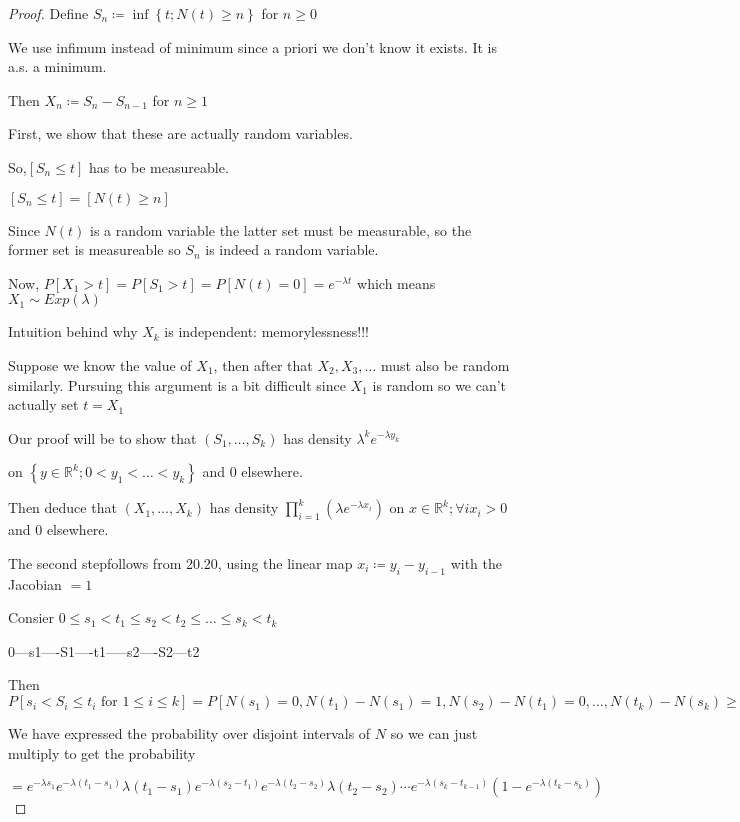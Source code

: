 \documentclass{article}
\theoremstyle{definition}
\begin{document}
\begin{proof}
    Define \(S_n\coloneqq \inf \left\{ t; N(t)\geq n \right\} \) for \(n\geq 0\) 

    We use infimum instead of minimum since a priori we don't know it exists. It is a.s. a minimum.

    Then \(X_n \coloneqq S_n - S_{n-1} \) for \(n\geq 1\) 

    First, we show that these are actually random variables.

    So,\([S_n \leq t]\) has to be measureable.

    \([S_n\leq t] = [N(t) \geq n]\) 

    Since \(N(t)\) is a random variable the latter set must be measurable, so the former set is measureable so \(S_n\) is indeed a random variable.

    Now, \(P[X_1 > t]=P[S_1>t]=P[N(t)=0]=e^{-\lambda t}\) which means \(X_1 \sim Exp(\lambda)\)

    Intuition behind why \(X_k\) is independent: memorylessness!!!

    Suppose we know the value of \(X_1\), then after that \(X_2,X_3,\dots \) must also be random similarly. Pursuing this argument is a bit difficult since \(X_1\) is random so we can't actually set \(t=X_1\) 

    Our proof will be to show that \((S_1,\dots ,S_k)\) has density \(\lambda ^k e^{-\lambda y_k} \)
    
    on \(\left\{ y\in \mathbb{R} ^k; 0<y_1 < \dots < y_k \right\} \) and \(0\) elsewhere.

    Then deduce that \((X_1, \dots ,X_k)\) has density \(\prod _{i=1}^k (\lambda e^{-\lambda x_i})\) on \(x\in\mathbb{R} ^k; \forall i x_i > 0\) and \(0\) elsewhere.

    The second stepfollows from 20.20, using the linear map \(x_i \coloneqq  y_i - y_{i-1}  \) with the Jacobian \(=1\)

    Consier \(0 \leq s_1 < t_1 \leq s_2 < t_2 \leq \dots \leq s_k < t_k\)

    0---s1----S1----t1-----s2----S2---t2 

    Then \(P[s_i < S_i \leq t_i \text{ for } 1 \leq i \leq k ] = P[N(s_1)=0,N(t_1)-N(s_1)=1,N(s_2)-N(t_1)=0,\dots ,N(t_k)-N(s_k)\geq 1]\)

    We have expressed the probability over disjoint intervals of \(N\) so we can just multiply to get the probability

    \(=e^{-\lambda s_1}e^{-\lambda(t_1-s_1)}\lambda (t_1-s_1)e^{-\lambda (s_2 - t_1)}e^{-\lambda (t_2 - s_2)}\lambda(t_2 - s_2)\cdots e^{-\lambda (s_k - t_{k-1})}(1-e^{-\lambda (t_k - s_k)})\) 


\end{proof}
\end{document}
